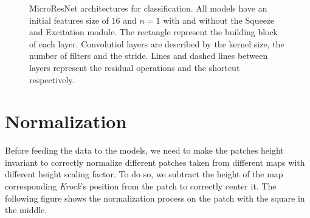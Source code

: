 \documentclass[../document.tex]{subfiles}
\begin{document}
\begin{figure}[htbp]
\begin{subfigure}[b]{0.22\textwidth}
        \caption{}
    \end{subfigure} 
    \caption{MicroResNet architectures for classification. All models have an initial features size of $16$ and $n=1$ with and without the Squeeze and Excitation module. The rectangle represent the building block of each layer. Convolutiol layers are described by the kernel size, the number of filters and the stride. Lines and dashed lines between layers represent the residual operations and the shortcut respectively.}
    \label{fig : microresnet}
\end{figure}

\section{Normalization}
Before feeding the data to the models, we need to make the patches height invariant to correctly normalize different patches taken from different maps with different height scaling factor. To do so, we subtract the height of the map corresponding \emph{Krock}'s position from the patch to correctly center it. The following figure shows the normalization process on the patch with the square in the middle.
\end{document}
